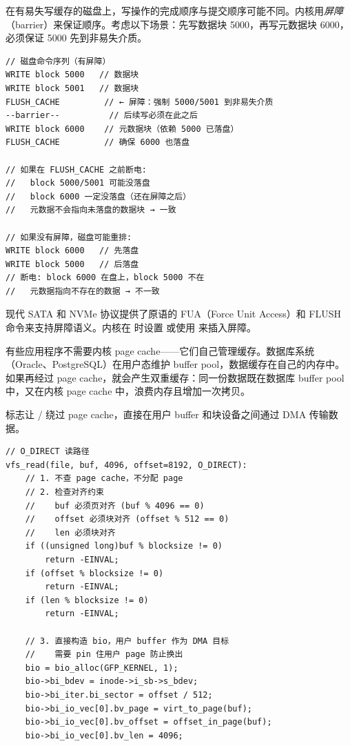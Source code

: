 \begin{filesystemlayout}
在有易失写缓存的磁盘上，写操作的完成顺序与提交顺序可能不同。内核用\emph{屏障}（barrier）来保证顺序。考虑以下场景：先写数据块 5000，再写元数据块 6000，必须保证 5000 先到非易失介质。

\begin{lstlisting}
// 磁盘命令序列（有屏障）
WRITE block 5000   // 数据块
WRITE block 5001   // 数据块
FLUSH_CACHE         // ← 屏障：强制 5000/5001 到非易失介质
--barrier--          // 后续写必须在此之后
WRITE block 6000    // 元数据块（依赖 5000 已落盘）
FLUSH_CACHE         // 确保 6000 也落盘

// 如果在 FLUSH_CACHE 之前断电:
//   block 5000/5001 可能没落盘
//   block 6000 一定没落盘（还在屏障之后）
//   元数据不会指向未落盘的数据块 → 一致

// 如果没有屏障，磁盘可能重排:
WRITE block 6000   // 先落盘
WRITE block 5000   // 后落盘
// 断电: block 6000 在盘上，block 5000 不在
//   元数据指向不存在的数据 → 不一致
\end{lstlisting}

现代 SATA 和 NVMe 协议提供了原语的 FUA（Force Unit Access）和 FLUSH 命令来支持屏障语义。内核在  时设置  或使用  来插入屏障。


有些应用程序不需要内核 page cache——它们自己管理缓存。数据库系统（Oracle、PostgreSQL）在用户态维护 buffer pool，数据缓存在自己的内存中。如果再经过 page cache，就会产生双重缓存：同一份数据既在数据库 buffer pool 中，又在内核 page cache 中，浪费内存且增加一次拷贝。

 标志让 / 绕过 page cache，直接在用户 buffer 和块设备之间通过 DMA 传输数据。

\begin{lstlisting}
// O_DIRECT 读路径
vfs_read(file, buf, 4096, offset=8192, O_DIRECT):
    // 1. 不查 page cache，不分配 page
    // 2. 检查对齐约束
    //    buf 必须页对齐 (buf % 4096 == 0)
    //    offset 必须块对齐 (offset % 512 == 0)
    //    len 必须块对齐
    if ((unsigned long)buf % blocksize != 0)
        return -EINVAL;
    if (offset % blocksize != 0)
        return -EINVAL;
    if (len % blocksize != 0)
        return -EINVAL;

    // 3. 直接构造 bio，用户 buffer 作为 DMA 目标
    //    需要 pin 住用户 page 防止换出
    bio = bio_alloc(GFP_KERNEL, 1);
    bio->bi_bdev = inode->i_sb->s_bdev;
    bio->bi_iter.bi_sector = offset / 512;
    bio->bi_io_vec[0].bv_page = virt_to_page(buf);
    bio->bi_io_vec[0].bv_offset = offset_in_page(buf);
    bio->bi_io_vec[0].bv_len = 4096;


\end{lstlisting}
\end{filesystemlayout}
